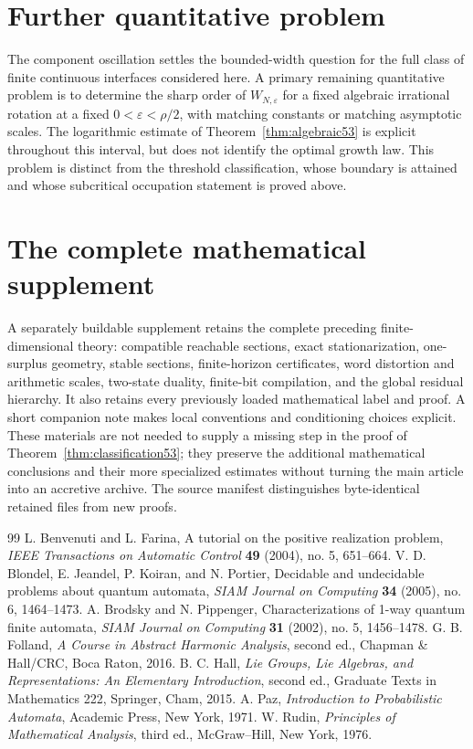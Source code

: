 \documentclass[11pt]{amsart}
\numberwithin{equation}{section}
\theoremstyle{definition}
\theoremstyle{remark}
\begin{document}
\section{Further quantitative problem}\label{sec:conclusion53}
The component oscillation settles the bounded-width question for the full class of finite continuous interfaces considered here. A primary remaining quantitative problem is to determine the sharp order of $W_{N,\varepsilon}$ for a fixed algebraic irrational rotation at a fixed $0<\varepsilon<\rho/2$, with matching constants or matching asymptotic scales. The logarithmic estimate of Theorem~\ref{thm:algebraic53} is explicit throughout this interval, but does not identify the optimal growth law. This problem is distinct from the threshold classification, whose boundary is attained and whose subcritical occupation statement is proved above.

\appendix
\section{The complete mathematical supplement}\label{sec:supplement53}
A separately buildable supplement retains the complete preceding finite-dimensional theory: compatible reachable sections, exact stationarization, one-surplus geometry, stable sections, finite-horizon certificates, word distortion and arithmetic scales, two-state duality, finite-bit compilation, and the global residual hierarchy. It also retains every previously loaded mathematical label and proof. A short companion note makes local conventions and conditioning choices explicit. These materials are not needed to supply a missing step in the proof of Theorem~\ref{thm:classification53}; they preserve the additional mathematical conclusions and their more specialized estimates without turning the main article into an accretive archive. The source manifest distinguishes byte-identical retained files from new proofs.

\begin{thebibliography}{99}
 L. Benvenuti and L. Farina, A tutorial on the positive realization problem, \emph{IEEE Transactions on Automatic Control} \textbf{49} (2004), no. 5, 651--664.
 V. D. Blondel, E. Jeandel, P. Koiran, and N. Portier, Decidable and undecidable problems about quantum automata, \emph{SIAM Journal on Computing} \textbf{34} (2005), no. 6, 1464--1473.
 A. Brodsky and N. Pippenger, Characterizations of 1-way quantum finite automata, \emph{SIAM Journal on Computing} \textbf{31} (2002), no. 5, 1456--1478.
 G. B. Folland, \emph{A Course in Abstract Harmonic Analysis}, second ed., Chapman \& Hall/CRC, Boca Raton, 2016.
 B. C. Hall, \emph{Lie Groups, Lie Algebras, and Representations: An Elementary Introduction}, second ed., Graduate Texts in Mathematics 222, Springer, Cham, 2015.
 A. Paz, \emph{Introduction to Probabilistic Automata}, Academic Press, New York, 1971.
 W. Rudin, \emph{Principles of Mathematical Analysis}, third ed., McGraw--Hill, New York, 1976.
\end{thebibliography}
\end{document}
